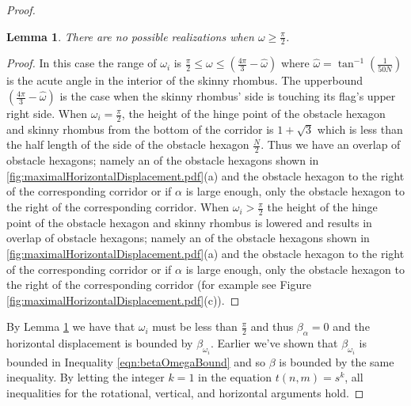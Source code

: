 \documentclass[10pt]{CSUNthesis}
\theoremstyle{plain}%
\newtheorem{lem}{Lemma}
\theoremstyle{definition}
\theoremstyle{remark}
\newcommand{\ith}{i^\text{th}}
\newcommand{\lr}[1]{\left( #1 \right)}
\begin{document}
\begin{proof}
\begin{lem}\label{lem:Omega}
There are no possible realizations when $\omega \geq \frac{\pi}{2}$.
\end{lem}
\begin{proof}
In this case the range of $\omega_i$ is $\frac{\pi}{2} \leq \omega \leq \lr{\frac{4 \pi}{3} - \hat{\omega}}$ where $\hat{\omega} = \tan^{-1} \lr{\frac{1}{50N}}$ is the acute angle in the interior of the skinny rhombus.  
The upperbound $\lr{\frac{4 \pi}{3} - \hat{\omega}}$ is the case when the skinny rhombus' side is touching its flag's upper right side.  
When $\omega_i = \frac{\pi}{2}$, the height of the hinge point of the obstacle hexagon and skinny rhombus from the bottom of the corridor is $1 + \sqrt{3}$ which is less than the half length of the side of the obstacle hexagon $\frac{N}{2}$.  
Thus we have an overlap of obstacle hexagons; namely an of the obstacle hexagons shown in \ref{fig:maximalHorizontalDisplacement.pdf}(a) and the obstacle hexagon to the right of the corresponding corridor or if $\alpha$ is large enough, only the obstacle hexagon to the right of the corresponding corridor.
When $\omega_i > \frac{\pi}{2}$ the height of the hinge point of the obstacle hexagon and skinny rhombus is lowered and results in overlap of obstacle hexagons; namely an of the obstacle hexagons shown in \ref{fig:maximalHorizontalDisplacement.pdf}(a) and the obstacle hexagon to the right of the corresponding corridor or if $\alpha$ is large enough, only the obstacle hexagon to the right of the corresponding corridor (for example see Figure \ref{fig:maximalHorizontalDisplacement.pdf}(c)).
\end{proof}

By Lemma \ref{lem:Omega} we have that $\omega_i$ must be less than $\frac{\pi}{2}$ and thus $\beta_\alpha = 0$ and the horizontal displacement is bounded by $\beta_{\omega_i}$.    
Earlier we've shown that $\beta_{\omega_i}$ is bounded in Inequality \ref{eqn:betaOmegaBound} and so $\beta$ is bounded by the same inequality.  
By letting the integer $k=1$ in the equation $t(n,m)=s^k$, all inequalities for the rotational, vertical, and horizontal arguments hold.




\end{proof}
\end{document}
